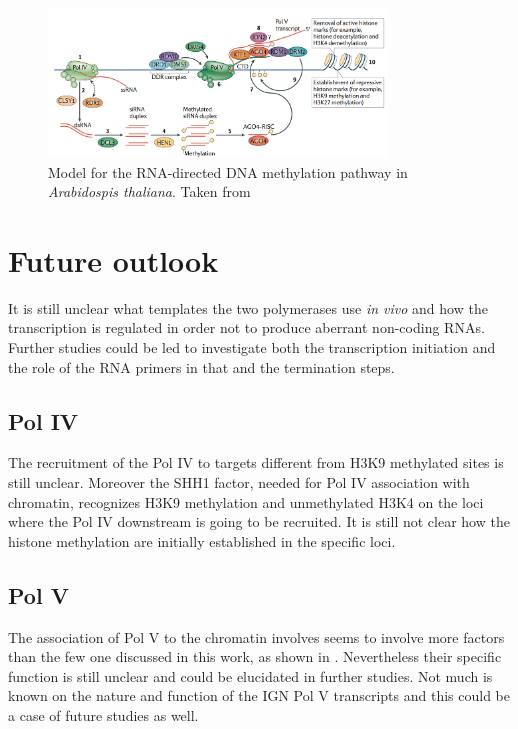 \documentclass[a4paper, twocolumn]{article}
\begin{document}
\begin{figure}
	\includegraphics[width=9cm]{complete_process.png}
	\caption{Model for the RNA-directed DNA methylation pathway in \textit{Arabidospis thaliana}. Taken from \cite{HAAG2011}}
	\label{fig:model}
\end{figure}

\section{Future outlook}
It is still unclear what templates the two polymerases use \textit{in vivo} and how the transcription is regulated in order not to produce aberrant non-coding RNAs. 
Further studies could be led to investigate both the transcription initiation and the role of the RNA primers in that and the termination steps. 

\subsection{Pol IV}
The recruitment of the Pol IV to targets different from H3K9 methylated sites is still unclear. Moreover the SHH1 factor, needed for Pol IV association with chromatin, recognizes H3K9 methylation and unmethylated H3K4 on the loci where the Pol IV downstream is going to be recruited. \cite{LAW2013} It is still not clear how the histone methylation are initially established in the specific loci.

\subsection{Pol V}
The association of Pol V to the chromatin involves seems to involve more factors than the few one discussed in this work, as shown in \cite{STROUD2012}. Nevertheless  their specific function is still unclear and could be elucidated in further studies. 
Not much is known on the nature and function of the IGN Pol V transcripts and this could be a case of future studies as well. 



\end{document}
